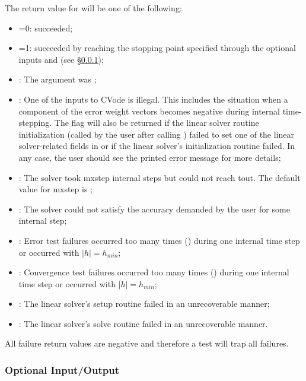 The return value  for  will be one of the following:
\begin{itemize}
\item {}=0:
   succeeded;
\item {}=1:
   succeeded by reaching the stopping point specified through
  the optional inputs  and  
  (see \S\ref{sss:optional_io});
\item {}:
  The  argument was ;
\item {}:
  One of the inputs to CVode is illegal. This includes the situation when a 
  component of the error weight vectors becomes negative during internal 
  time-stepping. The  flag will also be returned if the linear 
  solver routine initialization (called by the user after calling 
  ) failed to set one of the linear solver-related fields 
  in  or if the linear solver's initialization routine failed. 
  In any case, the user should see the printed error message for more details;
\item {}: 
  The solver took mxstep internal steps but could not reach tout. 
  The default value for mxstep is ;      
\item {}: 
  The solver could not satisfy the accuracy demanded by the user for some 
  internal step;
\item {}: 
  Error test failures occurred too many times () during one 
  internal time step or occurred with $|h| = h_{min}$;
\item {}: 
  Convergence test failures occurred too many times () during 
  one internal time step or occurred with $|h| = h_{min}$;             
\item {}: 
  The linear solver's setup routine failed in an unrecoverable manner;
\item {}: 
  The linear solver's solve routine failed in an unrecoverable manner.
\end{itemize} 
All failure return values are negative and therefore a test 
will trap all  failures.


\subsubsection{Optional Input/Output}\label{sss:optional_io}

